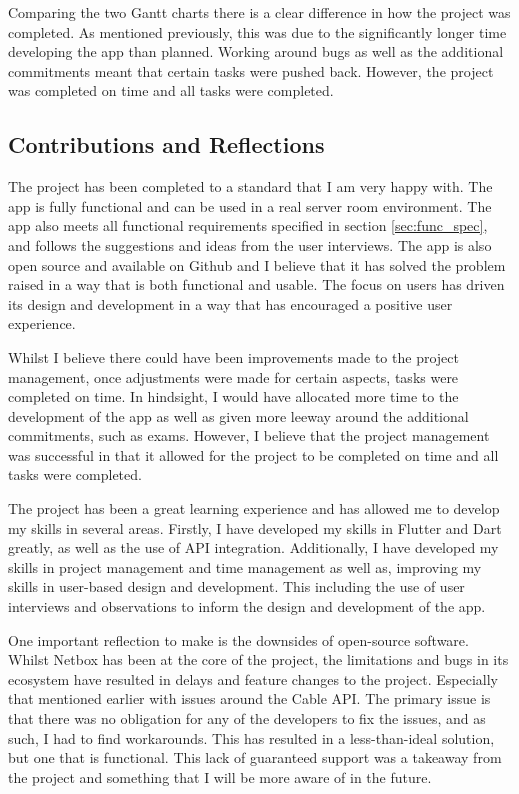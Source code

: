\documentclass [11pt,a4paper]{article}
\begin{document}
Comparing the two Gantt charts there is a clear difference in how the project was completed. As mentioned previously, this was due to the significantly longer time developing the app than planned. Working around bugs as well as the additional commitments meant that certain tasks were pushed back. However, the project was completed on time and all tasks were completed.


\subsection{Contributions and Reflections}
\label{sec:reflections}

The project has been completed to a standard that I am very happy with. The app is fully functional and can be used in a real server room environment. The app also meets all functional requirements specified in section \ref{sec:func_spec}, and follows the suggestions and ideas from the user interviews. The app is also open source and available on Github \cite{keeptrackgithub} and I believe that it has solved the problem raised in a way that is both functional and usable. The focus on users has driven its design and development in a way that has encouraged a positive user experience.

Whilst I believe there could have been improvements made to the project management, once adjustments were made for certain aspects, tasks were completed on time. In hindsight, I would have allocated more time to the development of the app as well as given more leeway around the additional commitments, such as exams. However, I believe that the project management was successful in that it allowed for the project to be completed on time and all tasks were completed. 

The project has been a great learning experience and has allowed me to develop my skills in several areas. Firstly, I have developed my skills in Flutter and Dart greatly, as well as the use of API integration. Additionally, I have developed my skills in project management and time management as well as, improving my skills in user-based design and development. This including the use of user interviews and observations to inform the design and development of the app. 

One important reflection to make is the downsides of open-source software. Whilst Netbox has been at the core of the project, the limitations and bugs in its ecosystem have resulted in delays and feature changes to the project. Especially that mentioned earlier with issues around the Cable API. The primary issue is that there was no obligation for any of the developers to fix the issues, and as such, I had to find workarounds. This has resulted in a less-than-ideal solution, but one that is functional. This lack of guaranteed support was a takeaway from the project and something that I will be more aware of in the future.
\end{document}
